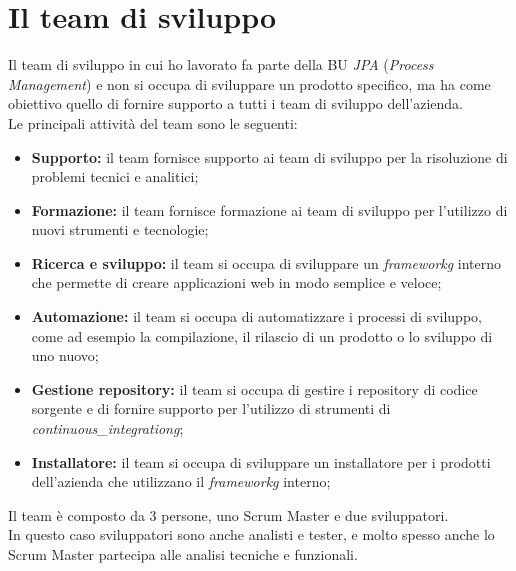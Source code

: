 \newpage

\section{Il team di sviluppo}
Il team di sviluppo in cui ho lavorato fa parte della BU \textit{JPA} (\textit{Process Management}) e non si
occupa di sviluppare un prodotto specifico, ma ha come obiettivo quello di fornire supporto a tutti i team di sviluppo
dell'azienda. \\
Le principali attività del team sono le seguenti:
\begin{itemize}
  \item \textbf{Supporto:} il team fornisce supporto ai team di sviluppo per la risoluzione di problemi tecnici e analitici;
  \item \textbf{Formazione:} il team fornisce formazione ai team di sviluppo per l'utilizzo di nuovi strumenti e tecnologie;
  \item \textbf{Ricerca e sviluppo:} il team si occupa di sviluppare un \textit{\gls{frameworkg}} interno che permette di creare applicazioni web in modo semplice e veloce;
  \item \textbf{Automazione:} il team si occupa di automatizzare i processi di sviluppo, come ad esempio la compilazione, il rilascio di un prodotto o lo sviluppo di uno nuovo; 
  \item \textbf{Gestione repository:} il team si occupa di gestire i repository di codice sorgente e di fornire supporto per l'utilizzo di strumenti di \textit{\gls{continuous_integrationg}};
  \item \textbf{Installatore:} il team si occupa di sviluppare un installatore per i prodotti dell'azienda che utilizzano il \textit{\gls{frameworkg}} interno;
\end{itemize}

\noindent Il team è composto da 3 persone, uno \gls{Scrum Master} e due sviluppatori. \\
In questo caso sviluppatori sono anche analisti e tester, e molto spesso anche lo \gls{Scrum Master} 
partecipa alle analisi tecniche e funzionali. \\


